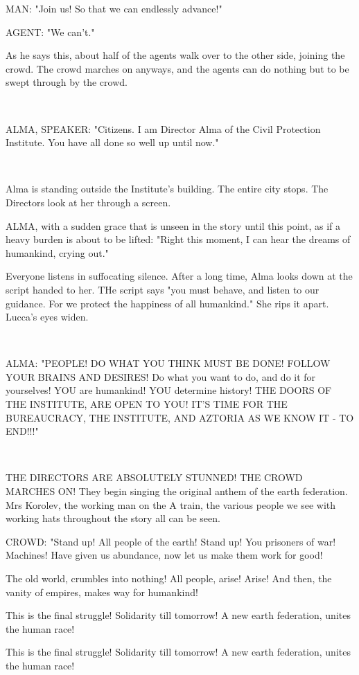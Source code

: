 \documentclass[11pt]{article}
\begin{document}
MAN: "Join us! So that we can endlessly advance!"

AGENT: "We can't."

As he says this, about half of the agents walk over to the other side, joining the crowd.
The crowd marches on anyways, and the agents can do nothing but to be swept through by the crowd. 

\ 

ALMA, SPEAKER: "Citizens. I am Director Alma of the Civil Protection Institute.
You have all done so well up until now."

\ 

Alma is standing outside the Institute's building.
The entire city stops.
The Directors look at her through a screen.

ALMA, with a sudden grace that is unseen in the story until this point, as if a heavy burden is about to be lifted: "Right this moment, I can hear the dreams of humankind, crying out."

Everyone listens in suffocating silence.
After a long time, Alma looks down at the script handed to her.
THe script says "you must behave, and listen to our guidance. 
For we protect the happiness of all humankind."
She rips it apart.
Lucca's eyes widen.

\ 

ALMA: "PEOPLE! 
DO WHAT YOU THINK MUST BE DONE!
FOLLOW YOUR BRAINS AND DESIRES!
Do what you want to do, and do it for yourselves!
YOU are humankind! 
YOU determine history!
THE DOORS OF THE INSTITUTE, ARE OPEN TO YOU!
IT'S TIME FOR THE BUREAUCRACY, THE INSTITUTE, AND AZTORIA AS WE KNOW IT - TO END!!!"

\ 

THE DIRECTORS ARE ABSOLUTELY STUNNED! THE CROWD MARCHES ON! 
They begin singing the original anthem of the earth federation.
Mrs Korolev, the working man on the A train, the various people we see with working hats throughout the story all can be seen.

CROWD: "Stand up! All people of the earth! 
Stand up! You prisoners of war!
Machines! Have given us abundance,
now let us make them work for good! 

The old world, crumbles into nothing! 
All people, arise! Arise! 
And then, the vanity of empires,
makes way for humankind!

This is the final struggle! 
Solidarity till tomorrow!
A new earth federation,
unites the human race! 

This is the final struggle!
Solidarity till tomorrow!
A new earth federation,
unites the human race!
\end{document}

